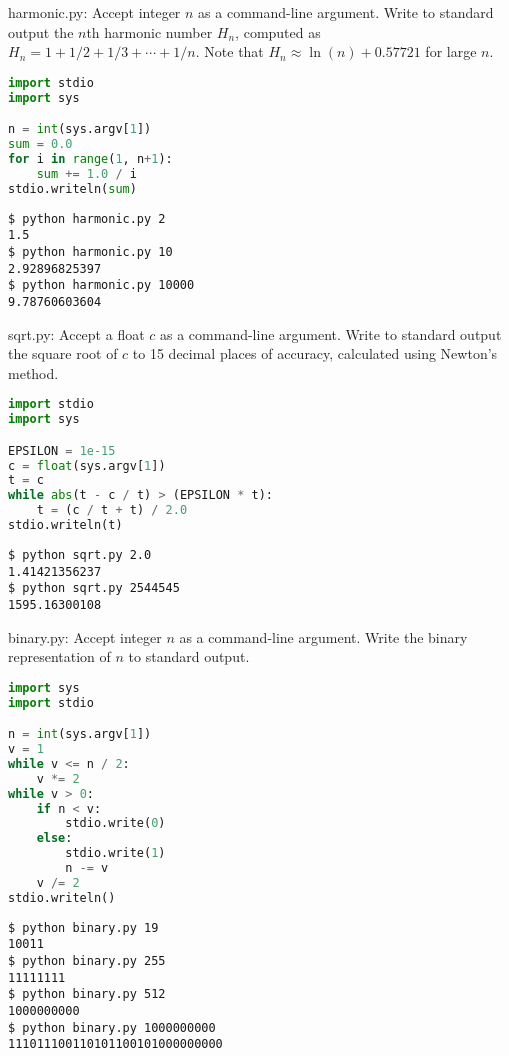 \documentclass[8pt,a4paper,compress,handout]{beamer}
\begin{document}
\begin{frame}[fragile]
\begin{framed}
\tiny harmonic.py: Accept integer $n$ as a command-line argument. Write to standard output the $n$th harmonic number $H_n$, computed as $H_n=1+1/2+1/3+\cdots+1/n$. Note that $H_n \approx \ln(n) + 0.57721$ for large $n$.
\end{framed}

\begin{lstlisting}[language=Python]
import stdio
import sys

n = int(sys.argv[1])
sum = 0.0
for i in range(1, n+1):
    sum += 1.0 / i
stdio.writeln(sum)
\end{lstlisting}

\begin{lstlisting}[language={}]
$ python harmonic.py 2
1.5
$ python harmonic.py 10
2.92896825397
$ python harmonic.py 10000
9.78760603604
\end{lstlisting}
\end{frame}

\begin{frame}[fragile]
\begin{framed}
\tiny sqrt.py: Accept a float $c$ as a command-line argument. Write to standard output the square root of $c$ to 15 decimal places of accuracy, calculated using Newton's method.
\end{framed}

\begin{lstlisting}[language=Python]
import stdio
import sys

EPSILON = 1e-15
c = float(sys.argv[1])
t = c
while abs(t - c / t) > (EPSILON * t):
    t = (c / t + t) / 2.0
stdio.writeln(t)
\end{lstlisting}

\begin{lstlisting}[language={}]
$ python sqrt.py 2.0
1.41421356237
$ python sqrt.py 2544545
1595.16300108
\end{lstlisting}
\end{frame}

\begin{frame}[fragile]
\begin{framed}
\tiny binary.py: Accept integer $n$ as a command-line argument. Write the binary representation of $n$ to standard output.
\end{framed}

\begin{lstlisting}[language=Python]
import sys
import stdio

n = int(sys.argv[1])
v = 1
while v <= n / 2:
    v *= 2
while v > 0:
    if n < v:
        stdio.write(0)
    else:
        stdio.write(1)
        n -= v
    v /= 2
stdio.writeln()
\end{lstlisting}

\begin{lstlisting}[language={}]
$ python binary.py 19
10011
$ python binary.py 255
11111111
$ python binary.py 512
1000000000
$ python binary.py 1000000000
111011100110101100101000000000
\end{lstlisting}
\end{frame}
\end{document}
